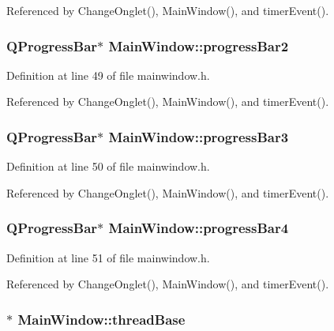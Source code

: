 Referenced by Change\-Onglet(), Main\-Window(), and timer\-Event().

\hypertarget{classMainWindow_a0594f2275ce1af436549e95cf62cfe7d}{
\subsubsection[{progress\-Bar2}]{\setlength{\rightskip}{0pt plus 5cm}Q\-Progress\-Bar$\ast$ Main\-Window\-::progress\-Bar2}}\label{classMainWindow_a0594f2275ce1af436549e95cf62cfe7d}


Definition at line 49 of file mainwindow.\-h.



Referenced by Change\-Onglet(), Main\-Window(), and timer\-Event().

\hypertarget{classMainWindow_a4afea90f9ba8cd1d26fa3b552639a012}{
\subsubsection[{progress\-Bar3}]{\setlength{\rightskip}{0pt plus 5cm}Q\-Progress\-Bar$\ast$ Main\-Window\-::progress\-Bar3}}\label{classMainWindow_a4afea90f9ba8cd1d26fa3b552639a012}


Definition at line 50 of file mainwindow.\-h.



Referenced by Change\-Onglet(), Main\-Window(), and timer\-Event().

\hypertarget{classMainWindow_a8672c729ad5494d2890676bf07518ea2}{
\subsubsection[{progress\-Bar4}]{\setlength{\rightskip}{0pt plus 5cm}Q\-Progress\-Bar$\ast$ Main\-Window\-::progress\-Bar4}}\label{classMainWindow_a8672c729ad5494d2890676bf07518ea2}


Definition at line 51 of file mainwindow.\-h.



Referenced by Change\-Onglet(), Main\-Window(), and timer\-Event().

\hypertarget{classMainWindow_aa35075e5c401c08057511b93444701cf}{
\subsubsection[{thread\-Base}]{$\ast$ Main\-Window\-::thread\-Base\hspace{0.3cm}{\ttfamily [private]}}}\label{classMainWindow_aa35075e5c401c08057511b93444701cf}


